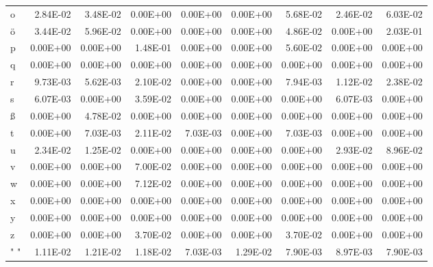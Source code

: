 \documentclass[11pt,a4paper]{CLabBookTemplate} %
\begin{document}
\begin{table}[htbp]
\begin{tabular}{lrrrrrrrr}
		o     & 2.84E-02 & 3.48E-02 & 0.00E+00 & 0.00E+00 & 0.00E+00 & 5.68E-02 & 2.46E-02 & 6.03E-02 \\
		ö     & 3.44E-02 & 5.96E-02 & 0.00E+00 & 0.00E+00 & 0.00E+00 & 4.86E-02 & 0.00E+00 & 2.03E-01 \\
		p     & 0.00E+00 & 0.00E+00 & 1.48E-01 & 0.00E+00 & 0.00E+00 & 5.60E-02 & 0.00E+00 & 0.00E+00 \\
		q     & 0.00E+00 & 0.00E+00 & 0.00E+00 & 0.00E+00 & 0.00E+00 & 0.00E+00 & 0.00E+00 & 0.00E+00 \\
		r     & 9.73E-03 & 5.62E-03 & 2.10E-02 & 0.00E+00 & 0.00E+00 & 7.94E-03 & 1.12E-02 & 2.38E-02 \\
		s     & 6.07E-03 & 0.00E+00 & 3.59E-02 & 0.00E+00 & 0.00E+00 & 0.00E+00 & 6.07E-03 & 0.00E+00 \\
		ß     & 0.00E+00 & 4.78E-02 & 0.00E+00 & 0.00E+00 & 0.00E+00 & 0.00E+00 & 0.00E+00 & 0.00E+00 \\
		t     & 0.00E+00 & 7.03E-03 & 2.11E-02 & 7.03E-03 & 0.00E+00 & 7.03E-03 & 0.00E+00 & 0.00E+00 \\
		u     & 2.34E-02 & 1.25E-02 & 0.00E+00 & 0.00E+00 & 0.00E+00 & 0.00E+00 & 2.93E-02 & 8.96E-02 \\
		v     & 0.00E+00 & 0.00E+00 & 7.00E-02 & 0.00E+00 & 0.00E+00 & 0.00E+00 & 0.00E+00 & 0.00E+00 \\
		w     & 0.00E+00 & 0.00E+00 & 7.12E-02 & 0.00E+00 & 0.00E+00 & 0.00E+00 & 0.00E+00 & 0.00E+00 \\
		x     & 0.00E+00 & 0.00E+00 & 0.00E+00 & 0.00E+00 & 0.00E+00 & 0.00E+00 & 0.00E+00 & 0.00E+00 \\
		y     & 0.00E+00 & 0.00E+00 & 0.00E+00 & 0.00E+00 & 0.00E+00 & 0.00E+00 & 0.00E+00 & 0.00E+00 \\
		z     & 0.00E+00 & 0.00E+00 & 3.70E-02 & 0.00E+00 & 0.00E+00 & 3.70E-02 & 0.00E+00 & 0.00E+00 \\
		" "   & 1.11E-02 & 1.21E-02 & 1.18E-02 & 7.03E-03 & 1.29E-02 & 7.90E-03 & 8.97E-03 & 7.90E-03 \\
	\end{tabular}%
	\label{tab:CI2}%
\end{table}%
\end{document}
